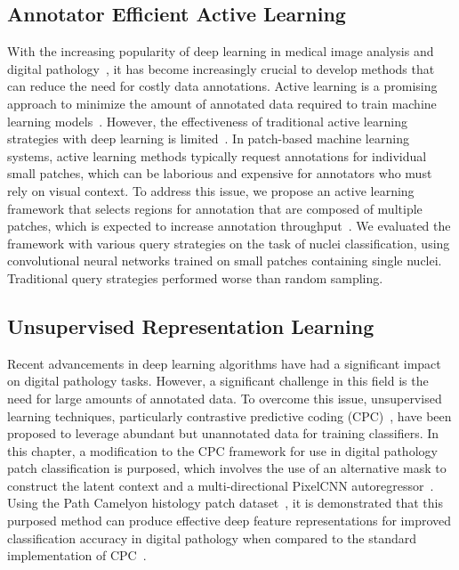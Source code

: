 \subsection*{Annotator Efficient Active Learning}
With the increasing popularity of deep learning in medical image analysis and digital pathology~\citep{tizhoosh2018artificial}, it has become increasingly crucial to develop methods that can reduce the need for costly data annotations. Active learning is a promising approach to minimize the amount of annotated data required to train machine learning models~\citep{settles2012active}. However, the effectiveness of traditional active learning strategies with deep learning is limited~\citep{wang2016cost}. In patch-based machine learning systems, active learning methods typically request annotations for individual small patches, which can be laborious and expensive for annotators who must rely on visual context. To address this issue, we propose an active learning framework that selects regions for annotation that are composed of multiple patches, which is expected to increase annotation throughput~\citep{carse2019active}. We evaluated the framework with various query strategies on the task of nuclei classification, using convolutional neural networks trained on small patches containing single nuclei. Traditional query strategies performed worse than random sampling.

\subsection*{Unsupervised Representation Learning}
Recent advancements in deep learning algorithms have had a significant impact on digital pathology tasks. However, a significant challenge in this field is the need for large amounts of annotated data. To overcome this issue, unsupervised learning techniques, particularly contrastive predictive coding (CPC)~\citep{oord2018representation}, have been proposed to leverage abundant but unannotated data for training classifiers. In this chapter, a modification to the CPC framework for use in digital pathology patch classification is purposed, which involves the use of an alternative mask to construct the latent context and a multi-directional PixelCNN autoregressor~\citep{oord2016pixel}. Using the Path Camelyon histology patch dataset~\citep{veeling2018rotation}, it is demonstrated that this purposed method can produce effective deep feature representations for improved classification accuracy in digital pathology when compared to the standard implementation of CPC~\citep{carse2021unsupervised}.

